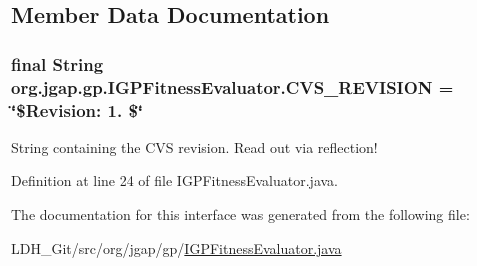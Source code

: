\subsection{Member Data Documentation}
\hypertarget{interfaceorg_1_1jgap_1_1gp_1_1_i_g_p_fitness_evaluator_ab6283bd647ed6f93f3bec1735120929c}{
\subsubsection[{C\-V\-S\-\_\-\-R\-E\-V\-I\-S\-I\-O\-N}]{\setlength{\rightskip}{0pt plus 5cm}final String org.\-jgap.\-gp.\-I\-G\-P\-Fitness\-Evaluator.\-C\-V\-S\-\_\-\-R\-E\-V\-I\-S\-I\-O\-N = \char`\"{}\$Revision\-: 1. \$\char`\"{}\hspace{0.3cm}{\ttfamily [static]}}}\label{interfaceorg_1_1jgap_1_1gp_1_1_i_g_p_fitness_evaluator_ab6283bd647ed6f93f3bec1735120929c}
String containing the C\-V\-S revision. Read out via reflection! 

Definition at line 24 of file I\-G\-P\-Fitness\-Evaluator.\-java.



The documentation for this interface was generated from the following file\-:\begin{DoxyCompactItemize}
\item 
L\-D\-H\-\_\-\-Git/src/org/jgap/gp/\hyperlink{_i_g_p_fitness_evaluator_8java}{I\-G\-P\-Fitness\-Evaluator.\-java}\end{DoxyCompactItemize}
